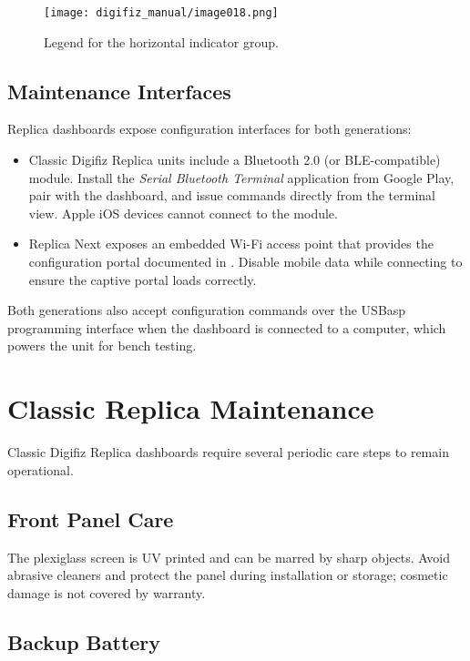 \begin{figure}[htbp]
    \centering
    \texttt{[image: digifiz\_manual/image018.png]}
    \caption{Legend for the horizontal indicator group.}
    \label{fig:indicator-legend}
\end{figure}

\subsection{Maintenance Interfaces}

Replica dashboards expose configuration interfaces for both generations:
\begin{itemize}
    \item Classic Digifiz Replica units include a Bluetooth 2.0 (or BLE-compatible) module.
          Install the \emph{Serial Bluetooth Terminal} application from Google Play, pair with the dashboard, and issue commands directly from the terminal view.
          Apple iOS devices cannot connect to the module.
    \item Replica Next exposes an embedded Wi-Fi access point that provides the configuration portal documented in .
          Disable mobile data while connecting to ensure the captive portal loads correctly.
\end{itemize}

Both generations also accept configuration commands over the USBasp programming interface when the dashboard is connected to a computer, which powers the unit for bench testing.

\section{Classic Replica Maintenance} \label{sec:classic-maintenance}

Classic Digifiz Replica dashboards require several periodic care steps to remain operational.

\subsection{Front Panel Care}

The plexiglass screen is UV printed and can be marred by sharp objects.
Avoid abrasive cleaners and protect the panel during installation or storage; cosmetic damage is not covered by warranty.

\subsection{Backup Battery}

